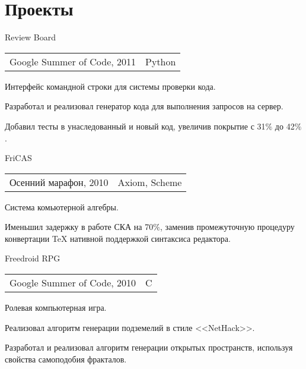 \documentclass[a4paper]{article}
\begin{document}
	\section{Проекты}
	\begin{multicols}{2}
		\raggedcolumns
		\begin{project2}{Review Board}{\begin{tabular}{@{}l|l}Google Summer of Code, 2011 & Python\\\end{tabular}}
			Интерфейс командной строки для системы проверки кода.
			\begin{items}
				\item Разработал и реализовал генератор кода для выполнения запросов на сервер.
				\item Добавил тесты в  унаследованный и новый код, увеличив покрытие с 31$\%$ до 42$\%$.
			\end{items}
		\end{project2}

		\begin{project2}{FriCAS}{\begin{tabular}{@{}l|l}Осенний марафон, 2010 & Axiom, Scheme\\\end{tabular}}
			Система комьютерной алгебры.
			\begin{items}
				\item Именьшил задержку в работе СКА на 70$\%$, заменив промежуточную процедуру конвертации \TeX{} нативной поддержкой синтаксиса редактора.
			\end{items}
		\end{project2}

		\columnbreak

		\begin{project2}{Freedroid RPG}{\begin{tabular}{@{}l|l}Google Summer of Code, 2010 & C\\\end{tabular}}
			Ролевая компьютерная игра.
			\begin{items}
				\item Реализовал алгоритм генерации подземелий в стиле <<NetHack>>.
				\item Разработал и реализовал алгоритм генерации открытых пространств, используя свойства самоподобия фракталов.
			\end{items}
		\end{project2}


\end{multicols}
\end{document}
